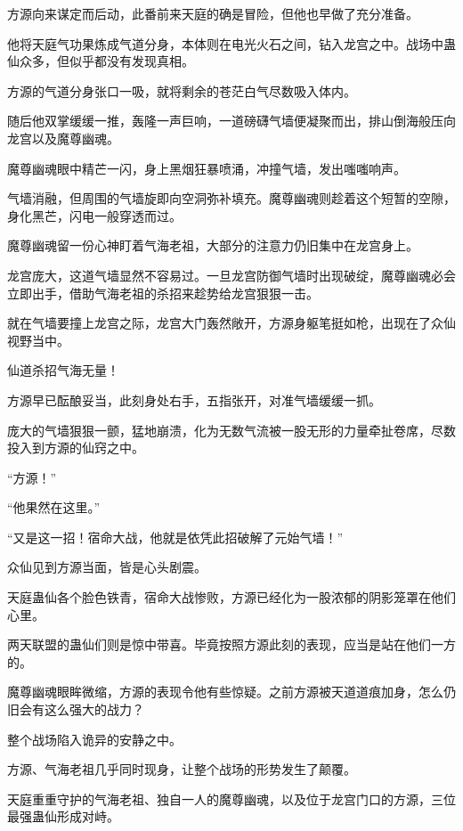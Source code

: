 
\begin{this_body}

方源向来谋定而后动，此番前来天庭的确是冒险，但他也早做了充分准备。

他将天庭气功果炼成气道分身，本体则在电光火石之间，钻入龙宫之中。战场中蛊仙众多，但似乎都没有发现真相。

方源的气道分身张口一吸，就将剩余的苍茫白气尽数吸入体内。

随后他双掌缓缓一推，轰隆一声巨响，一道磅礴气墙便凝聚而出，排山倒海般压向龙宫以及魔尊幽魂。

魔尊幽魂眼中精芒一闪，身上黑烟狂暴喷涌，冲撞气墙，发出嗤嗤响声。

气墙消融，但周围的气墙旋即向空洞弥补填充。魔尊幽魂则趁着这个短暂的空隙，身化黑芒，闪电一般穿透而过。

魔尊幽魂留一份心神盯着气海老祖，大部分的注意力仍旧集中在龙宫身上。

龙宫庞大，这道气墙显然不容易过。一旦龙宫防御气墙时出现破绽，魔尊幽魂必会立即出手，借助气海老祖的杀招来趁势给龙宫狠狠一击。

就在气墙要撞上龙宫之际，龙宫大门轰然敞开，方源身躯笔挺如枪，出现在了众仙视野当中。

仙道杀招气海无量！

方源早已酝酿妥当，此刻身处右手，五指张开，对准气墙缓缓一抓。

庞大的气墙狠狠一颤，猛地崩溃，化为无数气流被一股无形的力量牵扯卷席，尽数投入到方源的仙窍之中。

“方源！”

“他果然在这里。”

“又是这一招！宿命大战，他就是依凭此招破解了元始气墙！”

众仙见到方源当面，皆是心头剧震。

天庭蛊仙各个脸色铁青，宿命大战惨败，方源已经化为一股浓郁的阴影笼罩在他们心里。

两天联盟的蛊仙们则是惊中带喜。毕竟按照方源此刻的表现，应当是站在他们一方的。

魔尊幽魂眼眸微缩，方源的表现令他有些惊疑。之前方源被天道道痕加身，怎么仍旧会有这么强大的战力？

整个战场陷入诡异的安静之中。

方源、气海老祖几乎同时现身，让整个战场的形势发生了颠覆。

天庭重重守护的气海老祖、独自一人的魔尊幽魂，以及位于龙宫门口的方源，三位最强蛊仙形成对峙。


\end{this_body}
